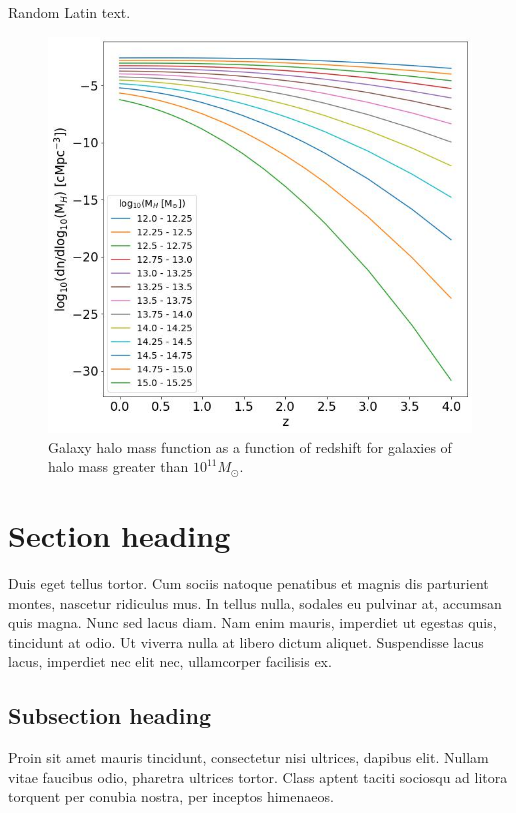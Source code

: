 \documentclass[12pt, twocolumn]{revtex4}    %
\begin{document}
Random Latin text.

\onecolumngrid


\begin{figure}[H]
\centering
\includegraphics[width=\linewidth]{Mass_Function_2.jpeg}
\caption{Galaxy halo mass function as a function of redshift for galaxies of halo mass greater than $10^{11}M_\odot$.}
\label{fig:5}
\end{figure}
\twocolumngrid


\section{Section heading}

Duis eget tellus tortor. Cum sociis natoque penatibus et magnis dis parturient montes, nascetur ridiculus mus. In tellus nulla, sodales eu pulvinar at, accumsan quis magna. Nunc sed lacus diam. Nam enim mauris, imperdiet ut egestas quis, tincidunt at odio. Ut viverra nulla at libero dictum aliquet. Suspendisse lacus lacus, imperdiet nec elit nec, ullamcorper facilisis ex.

\subsection{Subsection heading}

Proin sit amet mauris tincidunt, consectetur nisi ultrices, dapibus elit. Nullam vitae faucibus odio, pharetra ultrices tortor. Class aptent taciti sociosqu ad litora torquent per conubia nostra, per inceptos himenaeos. 
\end{document}
